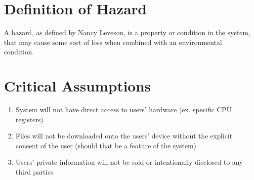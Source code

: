\documentclass[12pt]{article}
\begin{document}
\section{Definition of Hazard}
A hazard, as defined by Nancy Leveson, is a property or condition in the system, that may cause some sort of loss when combined with an environmental condition.

\section{Critical Assumptions}
\begin{enumerate}
	\item System will not have direct access to users' hardware (ex. specific CPU registers)
	\item Files will not be downloaded onto the users' device without the explicit consent of the user (should that be a feature of the system)
	\item Users' private information will not be sold or intentionally disclosed to any third parties
\end{enumerate}
\end{document}
